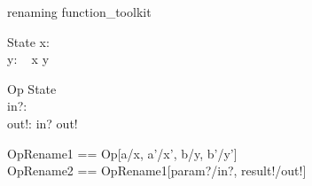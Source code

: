 \documentclass{article}
\begin{document}
\begin{zsection}
\SECTION renaming \parents function\_toolkit
\end{zsection}

\begin{schema}{State}
   x: \nat \\
   y: \power~\nat
\where
   x \in y
\end{schema}

\begin{schema}{Op}
   \Delta State\\
   in?: \nat \\
   out!: \nat
\where
   in? \neq out!
\end{schema}

\begin{zed}
   OpRename1 == Op[a/x, a'/x', b/y, b'/y'] \\
   OpRename2 == OpRename1[param?/in?, result!/out!] \\
\end{zed}
\end{document}
